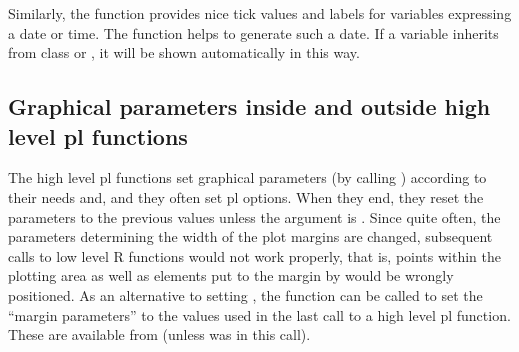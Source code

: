 \documentclass[11pt]{article}\usepackage[]{graphicx}\usepackage[]{color}
\begin{document}
\label{options.dateaxis}
Similarly, the function  provides nice tick values and labels 
for variables expressing a date or time. 
The function  helps to generate such a date. 
If a variable inherits from class  or , it will be shown
automatically in this way.

\subsection{Graphical parameters inside and outside high level pl functions}
The high level pl functions set graphical parameters (by calling ) 
according to their needs and, and they often set pl options. 
When they end, they reset the  parameters to the previous values
unless the argument  is .
Since quite often, the parameters determining the width of the plot margins are
changed, subsequent calls to low level R functions would not work properly,
that is, points within the plotting area as well as elements put to the 
margin by  would be wrongly positioned.
As an alternative to setting , the function 
can be called to set the ``margin parameters'' 
to the values used in the last call to a high level pl function.
These are available from  
(unless  was  in this call).
\end{document}
